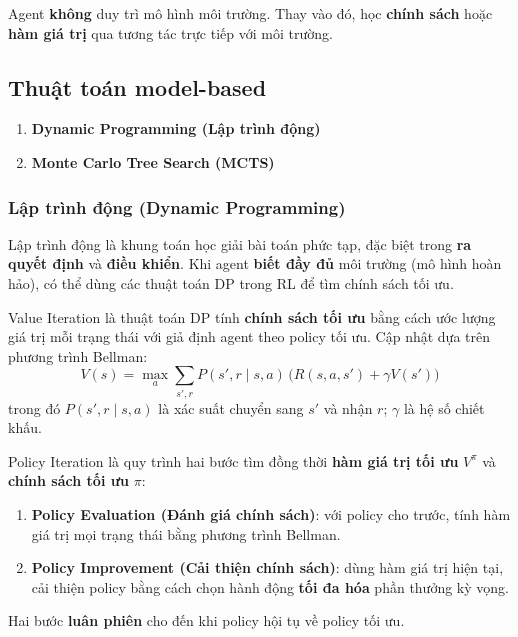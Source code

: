 \begin{phuongphap}[title={Model-Free Reinforcement Learning}]
Agent \textbf{không} duy trì mô hình môi trường.
Thay vào đó, học \textbf{chính sách} hoặc \textbf{hàm giá trị} qua tương tác trực tiếp với môi trường.
\end{phuongphap}

\subsection{Thuật toán model-based}

\begin{phuongphap}[title={Các thuật toán tối ưu và điều khiển model-based}]
\begin{enumerate}
  \item \textbf{Dynamic Programming (Lập trình động)}
  \item \textbf{Monte Carlo Tree Search (MCTS)}
\end{enumerate}
\end{phuongphap}

\subsubsection{Lập trình động (Dynamic Programming)}

\begin{dinhnghia}[title={Dynamic Programming}]
Lập trình động là khung toán học giải bài toán phức tạp, đặc biệt trong \textbf{ra quyết định} và \textbf{điều khiển}.
Khi agent \textbf{biết đầy đủ} môi trường (mô hình hoàn hảo), có thể dùng các thuật toán DP trong RL để tìm chính sách tối ưu.
\end{dinhnghia}

\begin{phuongphap}[title={Value Iteration --- Lặp giá trị}]
Value Iteration là thuật toán DP tính \textbf{chính sách tối ưu} bằng cách ước lượng giá trị mỗi trạng thái với giả định agent theo policy tối ưu.
Cập nhật dựa trên phương trình Bellman:
\[
V(s) = \max_{a} \sum_{s',r} P(s',r \mid s,a)\,\bigl(R(s,a,s') + \gamma V(s')\bigr)
\]
trong đó $P(s',r \mid s,a)$ là xác suất chuyển sang $s'$ và nhận $r$; $\gamma$ là hệ số chiết khấu.
\end{phuongphap}

\begin{phuongphap}[title={Policy Iteration --- Lặp chính sách}]
Policy Iteration là quy trình hai bước tìm đồng thời \textbf{hàm giá trị tối ưu} $V^\pi$ và \textbf{chính sách tối ưu} $\pi$:
\begin{enumerate}
  \item \textbf{Policy Evaluation (Đánh giá chính sách)}: với policy cho trước, tính hàm giá trị mọi trạng thái bằng phương trình Bellman.
  \item \textbf{Policy Improvement (Cải thiện chính sách)}: dùng hàm giá trị hiện tại, cải thiện policy bằng cách chọn hành động \textbf{tối đa hóa} phần thưởng kỳ vọng.
\end{enumerate}
Hai bước \textbf{luân phiên} cho đến khi policy hội tụ về policy tối ưu.
\end{phuongphap}

